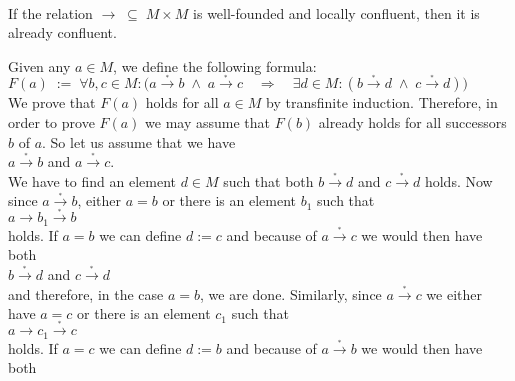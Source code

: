 \begin{Theorem} \hspace*{\fill} \\
  If the relation $\rightarrow \;\subseteq\; M \times M$ is well-founded and locally confluent, then it is
  already confluent.
\end{Theorem}

\proof
Given any $a \in M$, we define the following formula:
\\[0.2cm]
\hspace*{1.3cm}
$F(a) \;:=\; \forall b, c \in M: \bigl(a \stackrel{_*}{\rightarrow} b \;\wedge\; a \stackrel{_*}{\rightarrow}c \quad\Rightarrow\quad
 \exists d \in M: (b \stackrel{_*}{\rightarrow} d \;\wedge\; c \stackrel{_*}{\rightarrow} d)\bigr)
$
\\[0.2cm]
We  prove that $F(a)$ holds for all $a \in M$ by transfinite induction.
Therefore, in order to prove $F(a)$ we may assume that $F(b)$ already holds for all successors $b$ of $a$.
So let us assume that we have
\\[0.2cm]
\hspace*{1.3cm}
$a \stackrel{_*}{\rightarrow} b$ \quad and \quad $a \stackrel{_*}{\rightarrow} c$.
\\[0.2cm]
We have to find an element $d \in M$ such that both $b \stackrel{_*}{\rightarrow} d$ and $c \stackrel{_*}{\rightarrow} d$ holds.
Now since $a \stackrel{_*}{\rightarrow} b$, either $a = b$ or there is an element $b_1$ such that
\\[0.2cm]
\hspace*{1.3cm}
$a \rightarrow b_1 \stackrel{_*}{\rightarrow} b$
\\[0.2cm]
holds.  If $a = b$ we can define $d := c$ and because of $a \stackrel{_*}{\rightarrow} c$ we would then have both
\\[0.2cm]
\hspace*{1.3cm}
$b \stackrel{_*}{\rightarrow} d$ \quad and \quad $c \stackrel{_*}{\rightarrow} d$
\\[0.2cm]
and therefore, in the case $a = b$, we are done.  Similarly, since $a \stackrel{_*}{\rightarrow} c$ we either have
$a = c$ or there is an element $c_1$ such that
\\[0.2cm]
\hspace*{1.3cm}
$a \rightarrow c_1 \stackrel{_*}{\rightarrow} c$
\\[0.2cm]
holds.  If $a = c$ we can define $d := b$ and because of $a \stackrel{_*}{\rightarrow} b$ we would then have both
\\[0.2cm]
